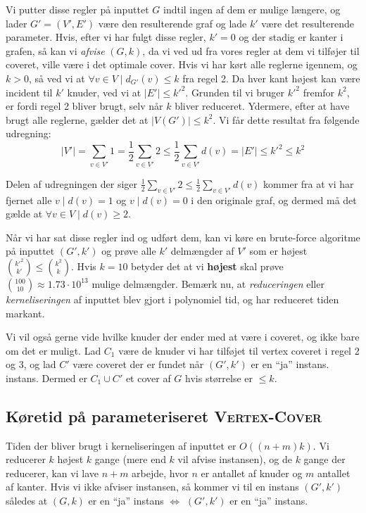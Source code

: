 Vi putter disse regler på inputtet $G$ indtil ingen af dem er mulige længere, og lader $G' = (V', E')$ være den resulterende graf og lade $k'$ være det resulterende parameter. Hvis, efter vi har fulgt disse regler, $k' = 0$ og der stadig er kanter i grafen, så kan vi \textit{afvise} $(G, k)$, da vi ved ud fra vores regler at dem vi tilføjer til coveret, ville være i det optimale cover. Hvis vi har kørt alle reglerne igennem, og $k > 0$, så ved vi at $\forall v \in V \mid d_{G'}(v) \le k$ fra regel 2. Da hver kant højest kan være incident til $k'$ knuder, ved vi at $|E'| \le k'^{2}$. Grunden til vi bruger $k'^{2}$ fremfor $k^{2}$, er fordi regel 2 bliver brugt, selv når $k$ bliver reduceret. Ydermere, efter at have brugt alle reglerne, gælder det at $|V(G')| \le k^{2}$. Vi får dette resultat fra følgende udregning:
\begin{equation*}
	|V'| = \sum_{v \in V'} 1 = \frac{1}{2} \sum_{v \in V'} 2 \le \frac{1}{2} \sum_{v \in V'} d(v) = |E'| \le k'^{2} \le k^{2}
\end{equation*}

Delen af udregningen der siger $\frac{1}{2} \sum_{v \in V'}2 \le \frac{1}{2} \sum_{v \in V'} d(v)  $ kommer fra at vi har fjernet alle $v \mid d(v) = 1$ og $v \mid d(v) = 0$ i den originale graf, og dermed må det gælde at $\forall v \in V \mid d(v) \ge 2$.

Når vi har sat disse regler ind og udført dem, kan vi køre en brute-force algoritme på inputtet $(G', k')$ og prøve alle $k'$ delmængder af $V'$ som er højest $\binom{k'^{2}}{k'} \le \binom{k^{2}}{k}$. Hvis $k = 10$ betyder det at vi \textbf{højest} skal prøve $\binom{100}{10} \approx 1.73 \cdot 10^{13}$ mulige delmængder. Bemærk nu, at \textit{reduceringen} eller \textit{kerneliseringen} af inputtet blev gjort i polynomiel tid, og har reduceret tiden markant.

Vi vil også gerne vide hvilke knuder der ender med at være i coveret, og ikke bare om det er muligt. Lad $C_{1}$ være de knuder vi har tilføjet til vertex coveret i regel 2 og 3, og lad $C'$ være coveret der er fundet når $(G', k')$ er en ``ja'' instans. instans. Dermed er $C_{1} \cup C'$ et cover af $G$ hvis størrelse er $\le k$.

\subsection{Køretid på parameteriseret \textsc{Vertex-Cover}}%
\label{subsec:label}

Tiden der bliver brugt i kerneliseringen af inputtet er $O((n+m)k)$. Vi reducerer $k$ højest $k$ gange (mere end $k$ vil afvise instansen), og de $k$ gange der reducerer, kan vi lave $n+m$ arbejde, hvor $n$ er antallet af knuder og $m$ antallet af kanter. Hvis vi ikke afviser instansen, så kommer vi til en instans $(G', k')$ således at $(G,k)$ er en ``ja'' instans $\iff$ $(G', k')$ er en ``ja'' instans.

